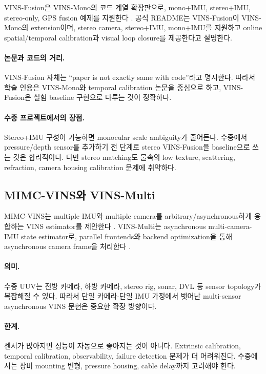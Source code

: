 \documentclass[11pt,a4paper]{article}
\begin{document}
VINS-Fusion은 VINS-Mono의 코드 계열 확장판으로, mono+IMU, stereo+IMU, stereo-only, GPS fusion 예제를 지원한다 \cite{vinsfusiongithub}.
공식 README는 VINS-Fusion이 VINS-Mono의 extension이며, stereo camera, stereo+IMU, mono+IMU를 지원하고 online spatial/temporal calibration과 visual loop closure를 제공한다고 설명한다.

\paragraph{논문과 코드의 거리.}
VINS-Fusion 자체는 ``paper is not exactly same with code''라고 명시한다.
따라서 학술 인용은 VINS-Mono와 temporal calibration 논문을 중심으로 하고, VINS-Fusion은 실험 baseline 구현으로 다루는 것이 정확하다.

\paragraph{수중 프로젝트에서의 장점.}
Stereo+IMU 구성이 가능하면 monocular scale ambiguity가 줄어든다.
수중에서 pressure/depth sensor를 추가하기 전 단계로 stereo VINS-Fusion을 baseline으로 쓰는 것은 합리적이다.
다만 stereo matching도 물속의 low texture, scattering, refraction, camera housing calibration 문제에 취약하다.

\subsection{MIMC-VINS와 VINS-Multi}

MIMC-VINS는 multiple IMU와 multiple camera를 arbitrary/asynchronous하게 융합하는 VINS estimator를 제안한다 \cite{eckenhoff2021mimcvins}.
VINS-Multi는 asynchronous multi-camera-IMU state estimator로, parallel frontends와 backend optimization을 통해 asynchronous camera frame을 처리한다 \cite{wang2024vinsmulti}.

\paragraph{의미.}
수중 UUV는 전방 카메라, 하방 카메라, stereo rig, sonar, DVL 등 sensor topology가 복잡해질 수 있다.
따라서 단일 카메라-단일 IMU 가정에서 벗어난 multi-sensor asynchronous VINS 문헌은 중요한 확장 방향이다.

\paragraph{한계.}
센서가 많아지면 성능이 자동으로 좋아지는 것이 아니다.
Extrinsic calibration, temporal calibration, observability, failure detection 문제가 더 어려워진다.
수중에서는 장비 mounting 변형, pressure housing, cable delay까지 고려해야 한다.
\end{document}
